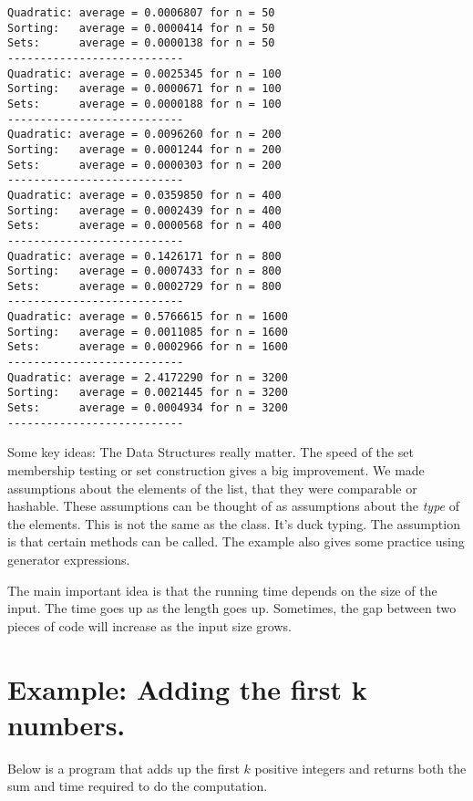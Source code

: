 \begin{Verbatim}
Quadratic: average = 0.0006807 for n = 50
Sorting:   average = 0.0000414 for n = 50
Sets:      average = 0.0000138 for n = 50
---------------------------
Quadratic: average = 0.0025345 for n = 100
Sorting:   average = 0.0000671 for n = 100
Sets:      average = 0.0000188 for n = 100
---------------------------
Quadratic: average = 0.0096260 for n = 200
Sorting:   average = 0.0001244 for n = 200
Sets:      average = 0.0000303 for n = 200
---------------------------
Quadratic: average = 0.0359850 for n = 400
Sorting:   average = 0.0002439 for n = 400
Sets:      average = 0.0000568 for n = 400
---------------------------
Quadratic: average = 0.1426171 for n = 800
Sorting:   average = 0.0007433 for n = 800
Sets:      average = 0.0002729 for n = 800
---------------------------
Quadratic: average = 0.5766615 for n = 1600
Sorting:   average = 0.0011085 for n = 1600
Sets:      average = 0.0002966 for n = 1600
---------------------------
Quadratic: average = 2.4172290 for n = 3200
Sorting:   average = 0.0021445 for n = 3200
Sets:      average = 0.0004934 for n = 3200
---------------------------

\end{Verbatim}


Some key ideas:
The Data Structures really matter.  The speed of the set membership testing or set construction gives a big improvement.
We made assumptions about the elements of the list, that they were comparable or hashable.  These assumptions can be thought of as assumptions about the \emph{type} of the elements.  This is not the same as the class.  It's duck typing.  The assumption is that certain methods can be called.
The example also gives some practice using generator expressions.


The main important idea is that the running time depends on the size of the input.  The time goes up as the length goes up.
Sometimes, the gap between two pieces of code will increase as the input size grows.

\section{Example: Adding the first k numbers.}


Below is a program that adds up the first $k$ positive integers and returns both the sum and time required to do the computation.

